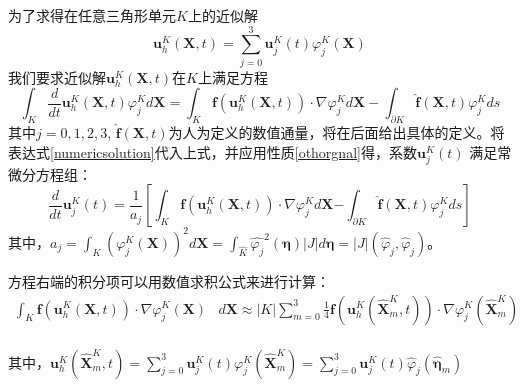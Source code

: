\documentclass[a4paper, 12pt, UTF8]{ctexart}
\newcommand{\bs}[1]{\boldsymbol{#1}}
\begin{document}
为了求得在任意三角形单元$K$上的近似解  
\begin{equation}\label{spacediscritization}
\bs u^K_{h}(\bs{X}, t)=\sum\limits_{j=0}^{3} \bs u^K_{j}(t) \varphi_{j}^K(\bs{X})
\end{equation}
我们要求近似解$\bs u^K_h(\bs{X}, t)$在$K$上满足方程
\begin{equation}
\int_K\frac{d}{d t} \bs u_{h}^K(\bs{X}, t)\varphi_j^Kd\bs{X}=\int_K\bs f(\bs u_{h}^K(\bs{X}, t))\cdot\nabla\varphi_j^Kd{\bs{X}}-\int_{\partial K}\hat{\bs f}(\bs{X}, t)\varphi_j^Kds
\end{equation}
其中$j=0, 1, 2, 3$, $\hat{\bs f}(\bs{X}, t)$为人为定义的数值通量，将在后面给出具体的定义。将表达式\eqref{numericsolution}代入上式，并应用性质\eqref{othorgnal}得，系数$\bs u_{j}^K(t)$ 满足常微分方程组：
\begin{equation}\label{semidiscrete}
 \frac{d}{d t} \bs u_{j}^K(t)=\frac{1}{a_{j}}\left[\int_{K} {\bs f}\left(\bs u_{h}^K(\bs{X}, t)\right) \cdot \nabla \varphi_{j}^Kd\bs{X}\right. \left.-\int_{\partial K}\hat{\bs f}\left(\bs{X}	, t\right) \varphi_{j}^K d s\right] 
\end{equation}
其中，$a_{j}=\int_{K}\left(\varphi_{j}^{K}(\bs{X})\right)^{2} d\bs{X} = \int_{\hat{K}}\hat{\varphi_{j}}^{2}(\bs{\eta}) |J|d\bs{\eta} = |J|\left(\hat{\varphi}_{j}, \hat{\varphi}_{j}\right)$。

方程右端的积分项可以用数值求积公式来进行计算：
\begin{equation}
\begin{split}
\int_{K} \bs f\left(\bs u_{h}^K(\bs{X}, t)\right) \cdot  \nabla \varphi_{j}^K(\bs{X}) &d \bs{X} 
\approx |K| \sum_{m=0}^{3} \frac{1}{4} \bs f\left(\bs u_{h}^K\left(\hat{\bs{X}}_{m}^K,  t\right)\right) \cdot \nabla \varphi_{j}^K\left(\hat{\bs{X}}_{m}^K\right)\\
\end{split}
\end{equation}

其中，$\bs{u}_{h}^{K}\left(\hat{\bs{X}}^{K}_{m}, t\right)=\sum\limits_{j=0}^{3} \bs{u}_{j}^{K}(t) \varphi_{j}^{K}\left(\hat{\bs{X}}^{K}_{m}\right)=\sum\limits_{j=0}^{3} \bs{u}_{j}^{K}(t) \hat{\varphi}_{j}\left(\hat{\bs{\eta}}_{m}\right)$
\end{document}
